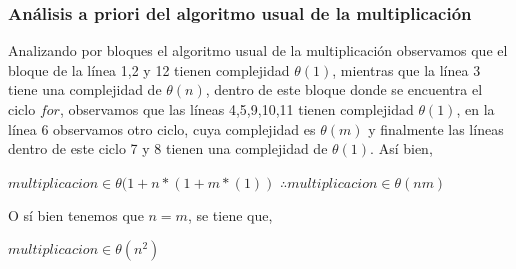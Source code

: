 \documentclass[12pt,twoside]{article}
\begin{document}
\subsubsection{Análisis a priori del algoritmo usual de la multiplicación}
Analizando por bloques el algoritmo usual de la multiplicación observamos que el bloque de la línea 1,2 y 12 tienen complejidad $\theta(1)$, mientras que la línea 3 tiene una complejidad de $\theta(n)$, dentro de este bloque donde se encuentra el ciclo $for$, observamos que las líneas 4,5,9,10,11 tienen complejidad $\theta(1)$, en la línea 6 observamos otro ciclo, cuya complejidad es $\theta(m)$ y finalmente las líneas dentro de este ciclo 7 y 8 tienen una complejidad de $\theta(1)$.\newline\newline
Así bien,
\begin{center}
    $multiplicacion \in \theta(1 + n*(1 + m*(1))$\newline
    $\therefore multiplicacion \in \theta(nm)$
\end{center}
O sí bien tenemos que $n = m$, se tiene que,
\begin{center}
    $multiplicacion \in \theta(n^2)$
\end{center}
\end{document}
